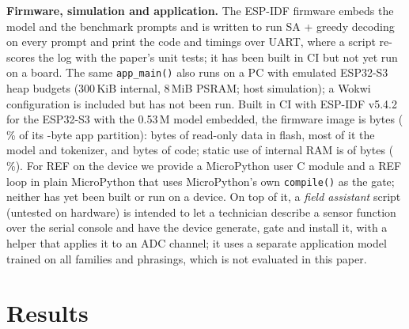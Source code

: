 \textbf{Firmware, simulation and application.} The ESP-IDF firmware embeds the model and the benchmark prompts and is written to run SA + greedy decoding on every prompt and print the code and timings over UART, where a script re-scores the log with the paper's unit tests; it has been built in CI but not yet run on a board. The same \texttt{app\_main()} also runs on a PC with emulated ESP32-S3 heap budgets (300\,KiB internal, 8\,MiB PSRAM; host simulation); a Wokwi configuration is included but has not been run. Built in CI with ESP-IDF v5.4.2 for the ESP32-S3 with the 0.53\,M model embedded, the firmware image is \idfappbytes{} bytes (\idfapppct\,\% of its \idfapppartitionbytes{}-byte app partition): \idfflashdatabytes{} bytes of read-only data in flash, most of it the model and tokenizer, and \idfflashcodebytes{} bytes of code; static use of internal RAM is \idfdiramusedbytes{} of \idfdiramtotalbytes{} bytes (\idfdirampct\,\%). For REF on the device we provide a MicroPython user C module and a REF loop in plain MicroPython that uses MicroPython's own \texttt{compile()} as the gate; neither has yet been built or run on a device. On top of it, a \emph{field assistant} script (untested on hardware) is intended to let a technician describe a sensor function over the serial console and have the device generate, gate and install it, with a helper that applies it to an ADC channel; it uses a separate application model trained on all families and phrasings, which is not evaluated in this paper.

\section{Results}
